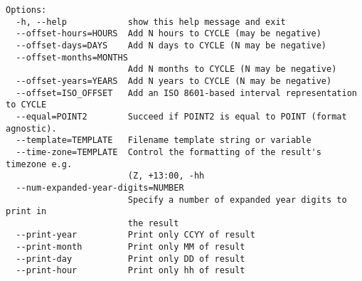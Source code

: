 \begin{lstlisting}
Options:
  -h, --help            show this help message and exit
  --offset-hours=HOURS  Add N hours to CYCLE (may be negative)
  --offset-days=DAYS    Add N days to CYCLE (N may be negative)
  --offset-months=MONTHS
                        Add N months to CYCLE (N may be negative)
  --offset-years=YEARS  Add N years to CYCLE (N may be negative)
  --offset=ISO_OFFSET   Add an ISO 8601-based interval representation to CYCLE
  --equal=POINT2        Succeed if POINT2 is equal to POINT (format agnostic).
  --template=TEMPLATE   Filename template string or variable
  --time-zone=TEMPLATE  Control the formatting of the result's timezone e.g.
                        (Z, +13:00, -hh
  --num-expanded-year-digits=NUMBER
                        Specify a number of expanded year digits to print in
                        the result
  --print-year          Print only CCYY of result
  --print-month         Print only MM of result
  --print-day           Print only DD of result
  --print-hour          Print only hh of result
\end{lstlisting}
